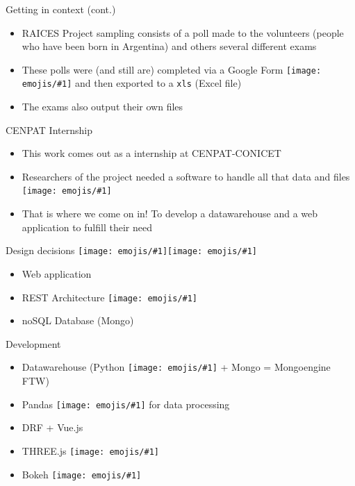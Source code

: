 \documentclass{beamer}
\newcommand{\emoji}[1]{\texttt{[image: emojis/\#1]}}
\begin{document}
\begin{frame}[fragile]{Getting in context (cont.)}
    \begin{itemize}
        \item RAICES Project sampling consists of a poll made to the volunteers (people who have been born in Argentina) and others several different exams
        \item These polls were (and still are) completed via a Google Form \emoji{eyes.png} and then exported to a \texttt{xls} (Excel file) 
        \item The exams also output their own files
    \end{itemize}
\end{frame}

\begin{frame}[fragile]{CENPAT Internship}
    \begin{itemize}
        \item This work comes out as a internship at CENPAT-CONICET
        \item Researchers of the project needed a software to handle all that data and files \emoji{scream.png}
        \item That is where we come on in! To develop a datawarehouse and a web application to fulfill their need
    \end{itemize}
\end{frame}

\begin{frame}[fragile]{Design decisions \emoji{straight_ruler.png}\emoji{triangular_ruler.png}}
    \begin{itemize}
        \item Web application
        \item REST Architecture \emoji{construction.png}
        \item noSQL Database (Mongo)
    \end{itemize}
\end{frame}

\begin{frame}[fragile]{Development}
    \begin{itemize}
        \item Datawarehouse (Python \emoji{snake.png} + Mongo = Mongoengine FTW)
        \item Pandas \emoji{pandas.png} for data processing
        \item DRF + Vue.js
        \item THREE.js \emoji{eye.png}
        \item Bokeh \emoji{bar_charts.png}
    \end{itemize}
\end{frame}
\end{document}
